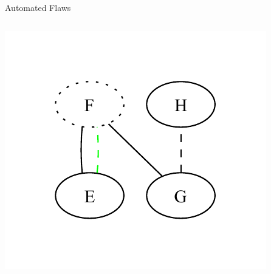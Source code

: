 \documentclass{beamer}
\begin{document}
\begin{frame}{Automated Flaws}
\begin{columns}[c]
\begin{column}{.5\linewidth}
            \includegraphics[width=\textwidth]{assets/graphs/SynExampleGlossaryGraph.pdf}
        \end{column}
    \end{columns} %
    \vspace{-0.25cm}
\end{frame}
\end{document}
